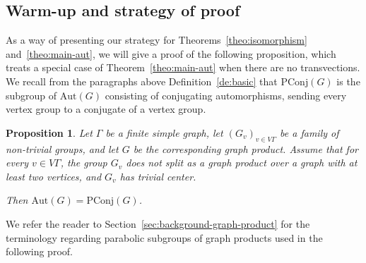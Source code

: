 \documentclass[a4paper,english,11pt]{article}
\newtheorem{prop}[de]{Proposition}
\theoremstyle{definition}
\theoremstyle{remark}
\newcommand{\Aut}{\mathrm{Aut}}
\newcommand{\PConj}{\mathrm{PConj}}
\begin{document}
\subsection{Warm-up and strategy of proof}

As a way of presenting our strategy for Theorems~\ref{theo:isomorphism} and~\ref{theo:main-aut}, we will give a proof of the following proposition, which treats a special case of Theorem~\ref{theo:main-aut} when there are no transvections. We recall from the {paragraphs} above Definition~\ref{de:basic} that $\PConj(G)$ is the subgroup of $\Aut(G)$ consisting of conjugating automorphisms, sending every vertex group to a conjugate of a vertex group.

\begin{prop}\label{prop:trivial-center}
Let $\Gamma$ be a finite simple graph, let $(G_v)_{v\in V\Gamma}$ be a family of {non-trivial} groups, and let $G$ be the corresponding graph product. Assume that for every $v\in V\Gamma$, the group $G_v$ does not split as a graph product over a graph with at least two vertices, and $G_v$ has trivial center.

Then $\Aut(G)=\mathrm{PConj}(G)$.
\end{prop}

We refer the reader to Section~\ref{sec:background-graph-product} for the terminology regarding parabolic subgroups of graph products used in the following proof.
\end{document}
